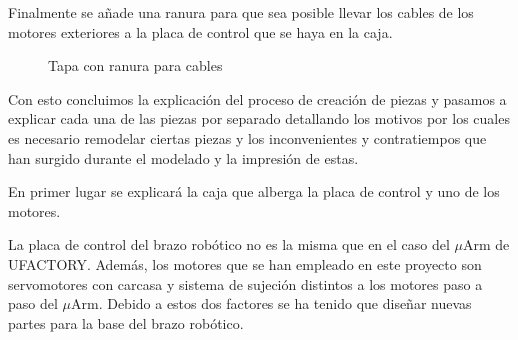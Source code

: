 Finalmente se añade una ranura para que sea posible llevar los cables de los motores exteriores a la placa de control que se haya en la caja.

\begin{figure}[H]
\centering
{}
\caption{Tapa con ranura para cables}
\label{fig:ranura_cables_tapa_superior}
\end{figure}

Con esto concluimos la explicación del proceso de creación de piezas y pasamos a explicar cada una de las piezas por separado detallando los motivos por los cuales es necesario remodelar ciertas piezas y los inconvenientes y contratiempos que han surgido durante el modelado y la impresión de estas.

En primer lugar se explicará la caja que alberga la placa de control y uno de los motores.

La placa de control del brazo robótico no es la misma que en el caso del $\mu$Arm de UFACTORY. Además, los motores que se han empleado en este proyecto son servomotores con carcasa y sistema de sujeción distintos a los motores paso a paso del $\mu$Arm. Debido a estos dos factores se ha tenido que diseñar nuevas partes para la base del brazo robótico.

